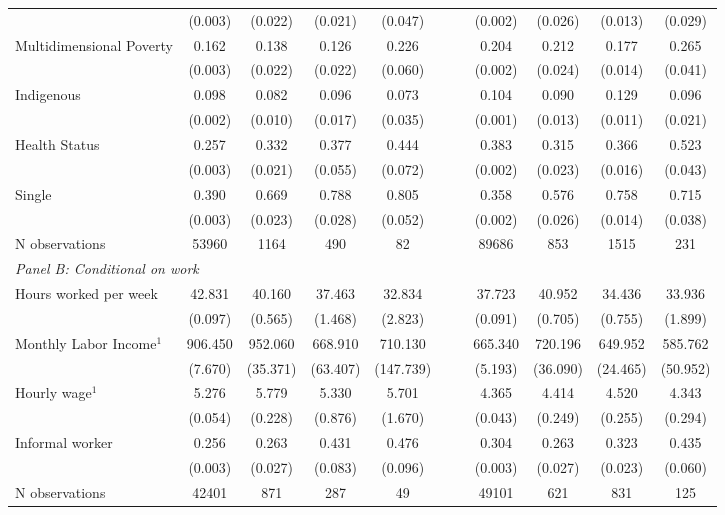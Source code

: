 \begin{table}[htbp]
{\begin{tabular}{lccccc|ccccc}
 & (0.003) & (0.022) & (0.021) & (0.047) &  &  & (0.002) & (0.026) & (0.013) & (0.029) \\
Multidimensional Poverty & 0.162 & 0.138 & 0.126 & 0.226 &  &  & 0.204 & 0.212 & 0.177 & 0.265 \\
 & (0.003) & (0.022) & (0.022) & (0.060) &  &  & (0.002) & (0.024) & (0.014) & (0.041) \\
Indigenous & 0.098 & 0.082 & 0.096 & 0.073 &  &  & 0.104 & 0.090 & 0.129 & 0.096 \\
 & (0.002) & (0.010) & (0.017) & (0.035) &  &  & (0.001) & (0.013) & (0.011) & (0.021) \\
Health Status & 0.257 & 0.332 & 0.377 & 0.444 &  &  & 0.383 & 0.315 & 0.366 & 0.523 \\
 & (0.003) & (0.021) & (0.055) & (0.072) &  &  & (0.002) & (0.023) & (0.016) & (0.043) \\
Single & 0.390 & 0.669 & 0.788 & 0.805 &  &  & 0.358 & 0.576 & 0.758 & 0.715 \\
 & (0.003) & (0.023) & (0.028) & (0.052) &  &  & (0.002) & (0.026) & (0.014) & (0.038) \\\hline
N observations        & 53960 & 1164 & 490 & 82 & \multicolumn{1}{l|}{} & \multicolumn{1}{l}{} & 89686 & 853 & 1515 & 231 \\ \hline
\multicolumn{5}{l}{\textit{Panel B: Conditional on work}}                                                                                                                                 & \multicolumn{1}{l|}{} & \multicolumn{1}{l}{} & \multicolumn{1}{l}{} & \multicolumn{1}{l}{} & \multicolumn{1}{l}{} & \multicolumn{1}{l}{}                                      \\
Hours worked per week & 42.831 & 40.160 & 37.463 & 32.834 &  &  & 37.723 & 40.952 & 34.436 & 33.936 \\
 & (0.097) & (0.565) & (1.468) & (2.823) &  &  & (0.091) & (0.705) & (0.755) & (1.899) \\
Monthly Labor Income$^1$ & 906.450 & 952.060 & 668.910 & 710.130 &  &  & 665.340 & 720.196 & 649.952 & 585.762 \\
 & (7.670) & (35.371) & (63.407) & (147.739) &  &  & (5.193) & (36.090) & (24.465) & (50.952) \\
Hourly wage$^1$ & 5.276 & 5.779 & 5.330 & 5.701 &  &  & 4.365 & 4.414 & 4.520 & 4.343 \\
 & (0.054) & (0.228) & (0.876) & (1.670) &  &  & (0.043) & (0.249) & (0.255) & (0.294) \\
Informal worker & 0.256 & 0.263 & 0.431 & 0.476 &  &  & 0.304 & 0.263 & 0.323 & 0.435 \\
 & (0.003) & (0.027) & (0.083) & (0.096) &  &  & (0.003) & (0.027) & (0.023) & (0.060) \\\hline
N observations        & 42401 & 871 & 287 & 49 & \multicolumn{1}{l|}{} & \multicolumn{1}{l}{} & 49101 & 621 & 831 & 125 \\ \hline
\end{tabular}
}


\end{table}
